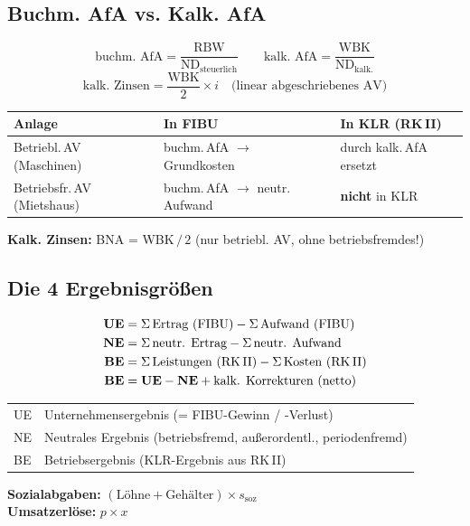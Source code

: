 \documentclass[10pt,a4paper]{article}
\begin{document}
\begin{multicols}{2}
\columnbreak

\subsection{Buchm. AfA vs. Kalk. AfA}

\begin{formelbox}
\[
\text{buchm. AfA} = \frac{\text{RBW}}{\text{ND}_{\text{steuerlich}}}
\qquad
\text{kalk. AfA} = \frac{\text{WBK}}{\text{ND}_{\text{kalk.}}}
\]
\[
\text{kalk. Zinsen} = \frac{\text{WBK}}{2} \times i
\quad \text{(linear abgeschriebenes AV)}
\]
\end{formelbox}

\begin{tabular}{|L{2.2cm}|L{2.2cm}|L{2.2cm}|}
\hline
{}
\textbf{Anlage} & \textbf{In FIBU} & \textbf{In KLR (RK\,II)} \\
\hline
Betriebl.\,AV (Maschinen) & buchm.\,AfA $\to$ Grundkosten & durch kalk.\,AfA ersetzt \\
\hline
Betriebsfr.\,AV (Mietshaus) & buchm.\,AfA $\to$ neutr.\,Aufwand & \textbf{nicht} in KLR \\
\hline
\end{tabular}

\vspace{4pt}
\textbf{Kalk. Zinsen:} BNA = WBK$\,/\,2$ (nur betriebl. AV, ohne betriebsfremdes!)

\subsection{Die 4 Ergebnisgrößen}

\begin{formelbox}
\renewcommand{\arraystretch}{1.35}
\begin{align*}
\mathbf{UE} &= \Sigma\,\text{Ertrag (FIBU)} - \Sigma\,\text{Aufwand (FIBU)}\\
\mathbf{NE} &= \Sigma\,\text{neutr. Ertrag} - \Sigma\,\text{neutr. Aufwand}\\
\mathbf{BE} &= \Sigma\,\text{Leistungen (RK\,II)} - \Sigma\,\text{Kosten (RK\,II)}\\
\mathbf{BE} &= \mathbf{UE} - \mathbf{NE} + \text{kalk. Korrekturen (netto)}
\end{align*}
\end{formelbox}

\begin{tabular}{|L{1.5cm}|L{5.5cm}|}
\hline
{}
UE & Unternehmensergebnis (= FIBU-Gewinn / -Verlust) \\
NE & Neutrales Ergebnis (betriebsfremd, außerordentl., periodenfremd) \\
BE & Betriebsergebnis (KLR-Ergebnis aus RK\,II) \\
\hline
\end{tabular}

\begin{hinweisbox}
\textbf{Sozialabgaben:} $(\text{Löhne} + \text{Gehälter}) \times s_{\text{soz}}$\\
\textbf{Umsatzerlöse:} $p \times x$
\end{hinweisbox}

\end{multicols}
\end{document}
